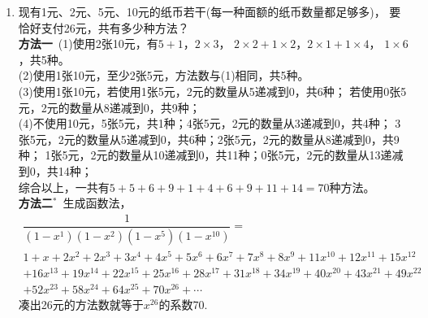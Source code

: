\begin{enumerate}[label={\textbf{\arabic*.}},leftmargin=
    \inteval{\myenumleftmargin}pt]
\item 现有1元、2元、5元、10元的纸币若干(每一种面额的纸币数量都足够多)，
要恰好支付26元，共有多少种方法？ 
\ifteach \\ \textbf{方法一}\ 
(1)使用2张10元，有$ 5+1 $，$ 2\times 3 $，
$ 2\times 2+1\times 2 $，$ 2\times 1+1\times 4 $，
$ 1\times 6 $，共5种。\\
(2)使用1张10元，至少2张5元，方法数与(1)相同，共5种。\\
(3)使用1张10元，若使用1张5元，2元的数量从5递减到0，共6种；
若使用0张5元，2元的数量从8递减到0，共9种；\\
(4)不使用10元，5张5元，共1种；4张5元，2元的数量从3递减到0，共4种；
3张5元，2元的数量从5递减到0，共6种；2张5元，2元的数量从8递减到0，共9种；
1张5元，2元的数量从10递减到0，共11种；0张5元，2元的数量从13递减到0，共14种；\\
综合以上，一共有$ 5+5+6+9+1+4+6+9+11+14=70 $种方法。\\
\textbf{方法二}$ ^* $\ 生成函数法，
\begin{gather*}
    \dfrac{1}{(1-x^1)(1-x^2)(1-x^{5})(1-x^{10})}=\\
1+x+2x^{2}+2x^{3}+3x^{4}+4x^{5}+5x^{6}+6x^{7}+7x^{8}+8x^{9}+11x^{10}+12x^{11}+15x^{12}\\ +16x^{13}+19x^{14}+22x^{15}+25x^{16}+28x^{17}+31x^{18}+34x^{19}+40x^{20}+43x^{21}+49x^{22}\\
+52x^{23}+58x^{24}+64x^{25}+70x^{26}+\cdots
\end{gather*}
凑出26元的方法数就等于$ x^{26} $的系数70. 
\fi

%
%
%
\end{enumerate}
\myfootnote{\CopyrightStatementChap}
\cleardoublepage

